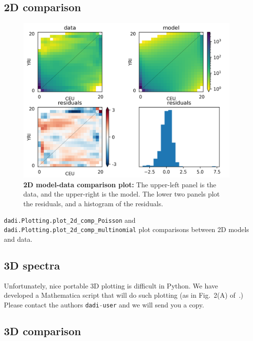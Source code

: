 \documentclass[12pt]{article}
\makeatletter
\newcommand{\py}[1]{\lstinline[language=Python, showstringspaces=False]@#1@}
\makeatother
\begin{document}
\subsection{2D comparison}

\begin{figure}
\centering
\includegraphics[scale=0.75]{../../examples/YRI_CEU/YRI_CEU}
\caption{\textbf{2D model-data comparison plot:} The upper-left panel is the data, and the upper-right is the model. The lower two panels plot the residuals, and a histogram of the residuals.\label{fig:2d_comp}}
\end{figure}

\py{dadi.Plotting.plot_2d_comp_Poisson} and \py{dadi.Plotting.plot_2d_comp_multinomial} plot comparisons between 2D models and data.

\subsection{3D spectra}

Unfortunately, nice portable 3D plotting is difficult in Python.
We have developed a Mathematica script that will do such plotting (as in Fig.~2(A) of~\cite{bib:Gutenkunst2009}.)
Please contact the authors \py{dadi-user} and we will send you a copy.

\subsection{3D comparison}
\end{document}
